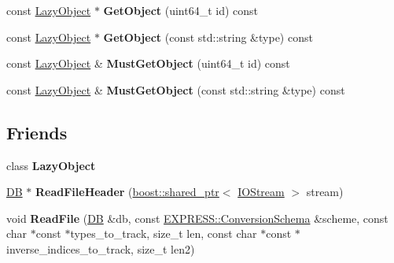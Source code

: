 \begin{DoxyCompactItemize}
\item 
\hypertarget{class_assimp_1_1_s_t_e_p_1_1_d_b_a38fe3a54d36b9f0366683659797defd7}{const \hyperlink{class_assimp_1_1_s_t_e_p_1_1_lazy_object}{Lazy\+Object} $\ast$ {\bfseries Get\+Object} (uint64\+\_\+t id) const }\label{class_assimp_1_1_s_t_e_p_1_1_d_b_a38fe3a54d36b9f0366683659797defd7}

\item 
\hypertarget{class_assimp_1_1_s_t_e_p_1_1_d_b_af96e2ba6d25c15ac29032e8a5dfb17c4}{const \hyperlink{class_assimp_1_1_s_t_e_p_1_1_lazy_object}{Lazy\+Object} $\ast$ {\bfseries Get\+Object} (const std\+::string \&type) const }\label{class_assimp_1_1_s_t_e_p_1_1_d_b_af96e2ba6d25c15ac29032e8a5dfb17c4}

\item 
\hypertarget{class_assimp_1_1_s_t_e_p_1_1_d_b_aab440fb5d4c61fee0fccffdb7b929a9b}{const \hyperlink{class_assimp_1_1_s_t_e_p_1_1_lazy_object}{Lazy\+Object} \& {\bfseries Must\+Get\+Object} (uint64\+\_\+t id) const }\label{class_assimp_1_1_s_t_e_p_1_1_d_b_aab440fb5d4c61fee0fccffdb7b929a9b}

\item 
\hypertarget{class_assimp_1_1_s_t_e_p_1_1_d_b_a6eb5168a1f7ced7c00dab7391ff5948c}{const \hyperlink{class_assimp_1_1_s_t_e_p_1_1_lazy_object}{Lazy\+Object} \& {\bfseries Must\+Get\+Object} (const std\+::string \&type) const }\label{class_assimp_1_1_s_t_e_p_1_1_d_b_a6eb5168a1f7ced7c00dab7391ff5948c}

\end{DoxyCompactItemize}
\subsection*{Friends}
\begin{DoxyCompactItemize}
\item 
\hypertarget{class_assimp_1_1_s_t_e_p_1_1_d_b_a7d75b9f7fe33387a4f4f35ade242f0d6}{class {\bfseries Lazy\+Object}}\label{class_assimp_1_1_s_t_e_p_1_1_d_b_a7d75b9f7fe33387a4f4f35ade242f0d6}

\item 
\hypertarget{class_assimp_1_1_s_t_e_p_1_1_d_b_ace8f2f5d590e13f98d34a04e79d2d2be}{\hyperlink{class_assimp_1_1_s_t_e_p_1_1_d_b}{D\+B} $\ast$ {\bfseries Read\+File\+Header} (\hyperlink{classboost_1_1shared__ptr}{boost\+::shared\+\_\+ptr}$<$ \hyperlink{class_assimp_1_1_i_o_stream}{I\+O\+Stream} $>$ stream)}\label{class_assimp_1_1_s_t_e_p_1_1_d_b_ace8f2f5d590e13f98d34a04e79d2d2be}

\item 
\hypertarget{class_assimp_1_1_s_t_e_p_1_1_d_b_aac477d587c93f18873f8635e7a564b50}{void {\bfseries Read\+File} (\hyperlink{class_assimp_1_1_s_t_e_p_1_1_d_b}{D\+B} \&db, const \hyperlink{class_assimp_1_1_s_t_e_p_1_1_e_x_p_r_e_s_s_1_1_conversion_schema}{E\+X\+P\+R\+E\+S\+S\+::\+Conversion\+Schema} \&scheme, const char $\ast$const $\ast$types\+\_\+to\+\_\+track, size\+\_\+t len, const char $\ast$const $\ast$inverse\+\_\+indices\+\_\+to\+\_\+track, size\+\_\+t len2)}\label{class_assimp_1_1_s_t_e_p_1_1_d_b_aac477d587c93f18873f8635e7a564b50}

\end{DoxyCompactItemize}


